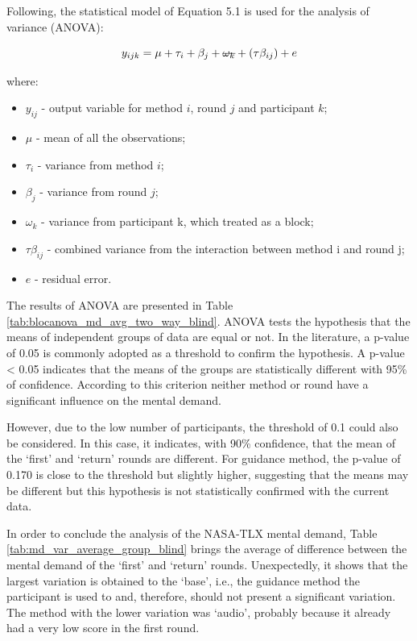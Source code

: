 Following, the statistical model of Equation 5.1 is used for the analysis of variance (ANOVA): 

\begin{equation}
    \label{eq:statistical_model}
    y_{ijk} = \mu + \tau_i + \beta_j + \msout{\omega_k} + (\tau\beta_{ij}) + e
\end{equation}

where:

\begin{itemize}
    \item $y_{ij}$ - output variable for method $i$, round $j$ and participant $k$;
    \item $\mu$ - mean of all the observations;
    \item $\tau_i$ - variance from method $i$;
    \item $\beta_j$ - variance from round $j$;
    \item \sout{$\omega_k$} - variance from participant k, which treated as a block;
    \item $\tau\beta_{ij}$ - combined variance from the interaction between method i and round j;
    \item $e$ - residual error.
\end{itemize}

The results of ANOVA are presented in Table \ref{tab:blocanova_md_avg_two_way_blind}. ANOVA tests the hypothesis that the means of independent groups of data are equal or not. In the literature, a p-value of 0.05 is commonly adopted as a threshold to confirm the hypothesis. A p-value < 0.05 indicates that the means of the groups are statistically different with 95\% of confidence. According to this criterion neither method or round have a significant influence on the mental demand.

However, due to the low number of participants, the threshold of 0.1 could also be considered. In this case, it indicates, with 90\% confidence, that the mean of the ‘first’ and ‘return’ rounds are different. For guidance method, the p-value of 0.170 is close to the threshold but slightly higher, suggesting that the means may be different but this hypothesis is not statistically confirmed with the current data. 



In order to conclude the analysis of the NASA-TLX mental demand, Table \ref{tab:md_var_average_group_blind} brings the average of difference between the mental demand of the ‘first’ and ‘return’ rounds. Unexpectedly, it shows that the largest variation is obtained to the ‘base’, i.e., the guidance method the participant is used to and, therefore, should not present a significant variation. The method with the lower variation was ‘audio’, probably because it already had a very low score in the first round. 

